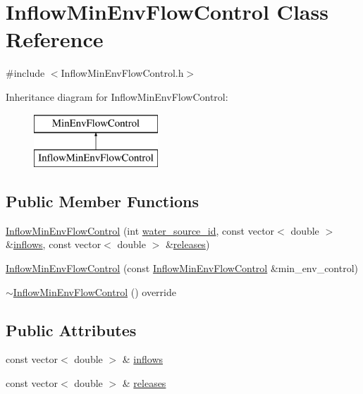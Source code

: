 \hypertarget{classInflowMinEnvFlowControl}{}\section{Inflow\+Min\+Env\+Flow\+Control Class Reference}
\label{classInflowMinEnvFlowControl}


{\ttfamily \#include $<$Inflow\+Min\+Env\+Flow\+Control.\+h$>$}

Inheritance diagram for Inflow\+Min\+Env\+Flow\+Control\+:\begin{figure}[H]
\begin{center}
\leavevmode
\includegraphics[height=2.000000cm]{classInflowMinEnvFlowControl}
\end{center}
\end{figure}
\subsection*{Public Member Functions}
\begin{DoxyCompactItemize}
\item 
\mbox{\hyperlink{classInflowMinEnvFlowControl_aff6c04aaa6e206b29b072aea6fb38367}{Inflow\+Min\+Env\+Flow\+Control}} (int \mbox{\hyperlink{classMinEnvFlowControl_aada518a047598f386daec1d0358023aa}{water\+\_\+source\+\_\+id}}, const vector$<$ double $>$ \&\mbox{\hyperlink{classInflowMinEnvFlowControl_a669660259afa9313c77094dec815a52f}{inflows}}, const vector$<$ double $>$ \&\mbox{\hyperlink{classInflowMinEnvFlowControl_a2f82b53516516be63eb169d377df1f55}{releases}})
\item 
\mbox{\hyperlink{classInflowMinEnvFlowControl_a6736e6aa07a27e314789e07a9ab30cad}{Inflow\+Min\+Env\+Flow\+Control}} (const \mbox{\hyperlink{classInflowMinEnvFlowControl}{Inflow\+Min\+Env\+Flow\+Control}} \&min\+\_\+env\+\_\+control)
\item 
\mbox{\hyperlink{classInflowMinEnvFlowControl_af96a86078cd257309ed55f0cd9ed032e}{$\sim$\+Inflow\+Min\+Env\+Flow\+Control}} () override
\end{DoxyCompactItemize}
\subsection*{Public Attributes}
\begin{DoxyCompactItemize}
\item 
const vector$<$ double $>$ \& \mbox{\hyperlink{classInflowMinEnvFlowControl_a669660259afa9313c77094dec815a52f}{inflows}}
\item 
const vector$<$ double $>$ \& \mbox{\hyperlink{classInflowMinEnvFlowControl_a2f82b53516516be63eb169d377df1f55}{releases}}
\end{DoxyCompactItemize}
